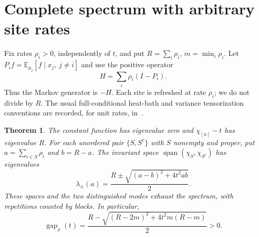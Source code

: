 \documentclass[11pt]{article}
\newtheorem{theorem}{Theorem}
\newcommand{\E}{\mathbb E}
\newcommand{\gap}{\operatorname{gap}}
\begin{document}
\section{Complete spectrum with arbitrary site rates}
Fix rates $\rho_i>0$, independently of $t$, and put
$R=\sum_i\rho_i$, $m=\min_i\rho_i$.
Let $P_i f=\E_{\mu_t}[f\mid x_j,\ j\ne i]$ and use the positive
operator
\begin{equation}\label{eq:generator}
 H=\sum_i\rho_i(I-P_i).
\end{equation}
Thus the Markov generator is $-H$. Each site is refreshed at rate
$\rho_i$; we do not divide by $R$. The usual full-conditional
heat-bath and variance tensorization conventions are recorded, for
unit rates, in~\cite[eqs.~(1.3), (1.5), (1.6)]{CMT}.

\begin{theorem}\label{thm:spectrum}
The constant function has eigenvalue zero and
$\chi_{[n]}-t$ has eigenvalue $R$. For each unordered pair
$\{S,S^c\}$ with $S$ nonempty and proper, put
$a=\sum_{i\in S}\rho_i$ and $b=R-a$. The invariant space
$\operatorname{span}(\chi_S,\chi_{S^c})$ has eigenvalues
\begin{equation}\label{eq:roots}
 \lambda_\pm(a)=\frac{R\pm\sqrt{(a-b)^2+4t^2ab}}2.
\end{equation}
These spaces and the two distinguished modes exhaust the spectrum,
with repetitions counted by blocks. In particular,
\begin{equation}\label{eq:gap}
 \gap_\rho(t)=\frac{R-\sqrt{(R-2m)^2+4t^2m(R-m)}}2>0.
\end{equation}
\end{theorem}
\end{document}
